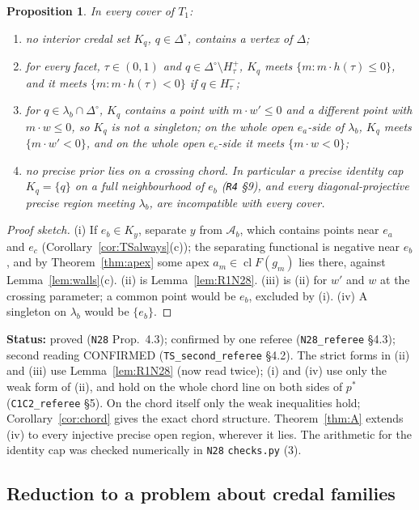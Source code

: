 \documentclass[11pt]{article}
\newtheorem{proposition}[theorem]{Proposition}
\theoremstyle{definition}
\theoremstyle{remark}
\newcommand{\Di}{\Delta^{\circ}}
\newcommand{\cl}{\operatorname{cl}}
\newcommand{\src}[1]{\texttt{#1}}
\newcommand{\status}[1]{\par\smallskip\noindent\textbf{Status:} #1\par\smallskip}
\begin{document}
\begin{proposition}\label{prop:vertexfree}
In every cover of $T_1$:
\begin{enumerate}[leftmargin=*,label=(\roman*)]
\item no interior credal set $K_q$, $q\in\Di$, contains a vertex of $\Delta$;
\item for every facet, $\tau\in(0,1)$ and $q\in\Di\setminus H^+_\tau$, $K_q$ meets $\{m:m\cdot h(\tau)\le0\}$, and it meets $\{m:m\cdot h(\tau)<0\}$ if $q\in H^-_\tau$;
\item for $q\in\lambda_b\cap\Di$, $K_q$ contains a point with $m\cdot w'\le0$ and a different point with $m\cdot w\le0$, so $K_q$ is not a singleton; on the whole open $e_a$-side of $\lambda_b$, $K_q$ meets $\{m\cdot w'<0\}$, and on the whole open $e_c$-side it meets $\{m\cdot w<0\}$;
\item no precise prior lies on a crossing chord. In particular a precise identity cap $K_q=\{q\}$ on a full neighbourhood of $e_b$ (\src{R4} \S9), and every diagonal-projective precise region meeting $\lambda_b$, are incompatible with every cover.
\end{enumerate}
\end{proposition}
\begin{proof}[Proof sketch]
(i) If $e_b\in K_y$, separate $y$ from $\mathcal A_b$, which contains points near $e_a$ and $e_c$ (Corollary~\ref{cor:TSalways}(c)); the separating functional is negative near $e_b$, and by Theorem~\ref{thm:apex} some apex $a_m\in\cl F(g_m)$ lies there, against Lemma~\ref{lem:walls}(c). (ii) is Lemma~\ref{lem:R1N28}. (iii) is (ii) for $w'$ and $w$ at the crossing parameter; a common point would be $e_b$, excluded by (i). (iv) A singleton on $\lambda_b$ would be $\{e_b\}$.
\end{proof}
\status{proved (\src{N28} Prop.~4.3); confirmed by one referee (\src{N28\_referee} \S4.3); second reading CONFIRMED (\src{TS\_second\_referee} \S4.2). The strict forms in (ii) and (iii) use Lemma~\ref{lem:R1N28} (now read twice); (i) and (iv) use only the weak form of (ii), and hold on the whole chord line on both sides of $p^*$ (\src{C1C2\_referee} \S5). On the chord itself only the weak inequalities hold; Corollary~\ref{cor:chord} gives the exact chord structure. Theorem~\ref{thm:A} extends (iv) to every injective precise open region, wherever it lies. The arithmetic for the identity cap was checked numerically in \src{N28} \texttt{checks.py} (3).}

\subsection{Reduction to a problem about credal families}\label{sec:general-CF}
\end{document}
